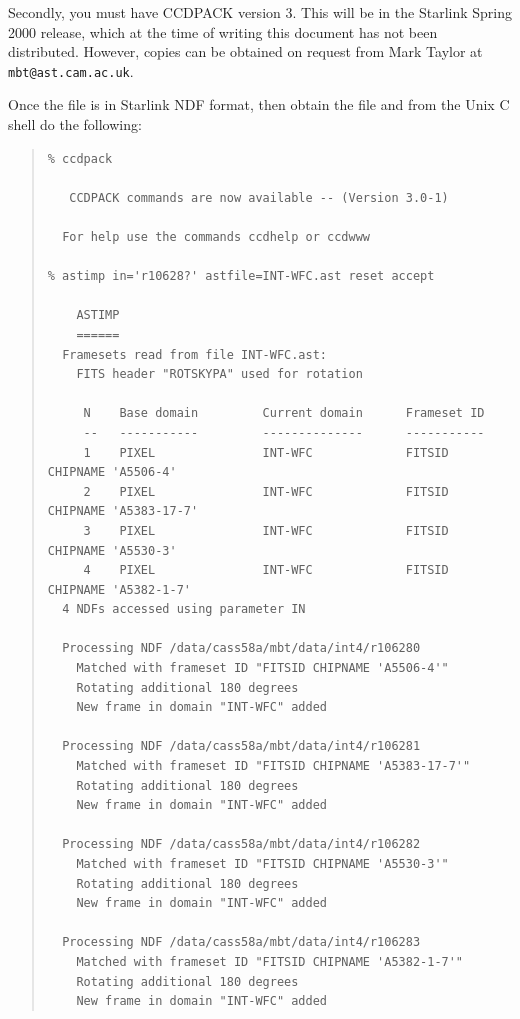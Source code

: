 \documentclass[11pt]{article}
\newenvironment{squote}{\begin{quote}\small}{\end{quote}}
\begin{document}
Secondly, you must have CCDPACK version 3.
This will be in the Starlink Spring 2000 release, which at the time
of writing this document has not been distributed.
However, copies can be obtained on request from Mark Taylor 
at {\tt mbt@ast.cam.ac.uk}.



Once the file is in Starlink NDF format, then obtain the file 
and from the Unix C shell do the following:
\begin{squote}
\begin{verbatim}
% ccdpack 

   CCDPACK commands are now available -- (Version 3.0-1)
   
  For help use the commands ccdhelp or ccdwww

% astimp in='r10628?' astfile=INT-WFC.ast reset accept

    ASTIMP
    ======
  Framesets read from file INT-WFC.ast:
    FITS header "ROTSKYPA" used for rotation

     N    Base domain         Current domain      Frameset ID
     --   -----------         --------------      -----------
     1    PIXEL               INT-WFC             FITSID CHIPNAME 'A5506-4'
     2    PIXEL               INT-WFC             FITSID CHIPNAME 'A5383-17-7'
     3    PIXEL               INT-WFC             FITSID CHIPNAME 'A5530-3'
     4    PIXEL               INT-WFC             FITSID CHIPNAME 'A5382-1-7'
  4 NDFs accessed using parameter IN

  Processing NDF /data/cass58a/mbt/data/int4/r106280
    Matched with frameset ID "FITSID CHIPNAME 'A5506-4'"
    Rotating additional 180 degrees
    New frame in domain "INT-WFC" added

  Processing NDF /data/cass58a/mbt/data/int4/r106281
    Matched with frameset ID "FITSID CHIPNAME 'A5383-17-7'"
    Rotating additional 180 degrees
    New frame in domain "INT-WFC" added

  Processing NDF /data/cass58a/mbt/data/int4/r106282
    Matched with frameset ID "FITSID CHIPNAME 'A5530-3'"
    Rotating additional 180 degrees
    New frame in domain "INT-WFC" added

  Processing NDF /data/cass58a/mbt/data/int4/r106283
    Matched with frameset ID "FITSID CHIPNAME 'A5382-1-7'"
    Rotating additional 180 degrees
    New frame in domain "INT-WFC" added
\end{verbatim}
\end{squote}
\end{document}
